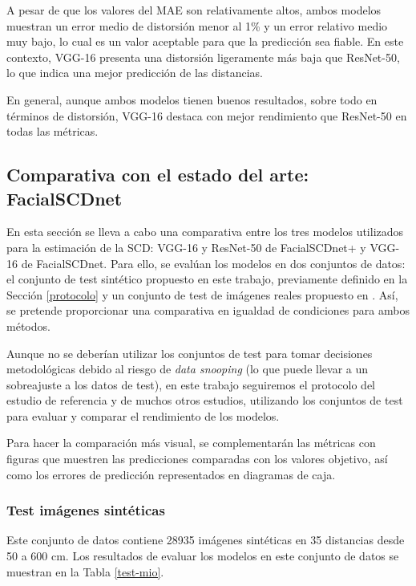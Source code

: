 A pesar de que los valores del MAE son relativamente altos, ambos modelos muestran un error medio de distorsión menor al 1\% y un error relativo medio muy bajo, lo cual es un valor aceptable para que la predicción sea fiable. En este contexto, VGG-16 presenta una distorsión ligeramente más baja que ResNet-50, lo que indica una mejor predicción de las distancias.

En general, aunque ambos modelos tienen buenos resultados, sobre todo en términos de distorsión, VGG-16 destaca con mejor rendimiento que ResNet-50 en todas las métricas.

\subsection{Comparativa con el estado del arte: FacialSCDnet}

En esta sección se lleva a cabo una comparativa entre los tres modelos utilizados para la estimación de la SCD: VGG-16 y ResNet-50 de FacialSCDnet+ y VGG-16 de FacialSCDnet. Para ello, se evalúan los modelos en dos conjuntos de datos: el conjunto de test sintético propuesto en este trabajo, previamente definido en la Sección \ref{protocolo} y un conjunto de test de imágenes reales propuesto en \cite{14}. Así, se pretende proporcionar una comparativa en igualdad de condiciones para ambos métodos. 

Aunque no se deberían utilizar los conjuntos de test para tomar decisiones metodológicas debido al riesgo de \textit{data snooping} (lo que puede llevar a un sobreajuste a los datos de test), en este trabajo seguiremos el protocolo del estudio de referencia \cite{14} y de muchos otros estudios, utilizando los conjuntos de test para evaluar y comparar el rendimiento de los modelos.

Para hacer la comparación más visual, se complementarán las métricas con figuras que muestren las predicciones comparadas con los valores objetivo, así como los errores de predicción representados en diagramas de caja.

\subsubsection{Test imágenes sintéticas}

Este conjunto de datos contiene 28935 imágenes sintéticas en 35 distancias desde 50 a 600 cm. Los resultados de evaluar los modelos en este conjunto de datos se muestran en la Tabla \ref{test-mio}.

